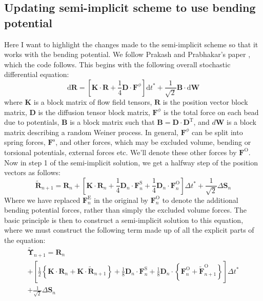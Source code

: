 \documentclass{article}
\begin{document}
\subsection{Updating semi-implicit scheme to use bending potential}
Here I want to highlight the changes made to the semi-implicit scheme so that it works with the bending potential.
We follow Prakash and Prabhakar's paper \cite{Prabhakar2004}, which the code follows.
This begins with the following overall stochastic differential equation:
\begin{equation}
    \mathrm{d} \boldsymbol{R}=\left[\boldsymbol{K} \cdot \boldsymbol{R}+\frac{1}{4} \boldsymbol{D} \cdot \boldsymbol{F}^{\phi}\right] \mathrm{d} t^{*}+\frac{1}{\sqrt{2}} \boldsymbol{B} \cdot \mathrm{d} \boldsymbol{W}
\end{equation}
where $\bm{K}$ is a block matrix of flow field tensors, $\bm{R}$ is the position vector block matrix, $\bm{D}$ is the diffusion tensor block matrix, $\bm{F}^{\phi}$ is the total force on each bead due to potentials, $\bm{B}$ is a block matrix such that $\bm{B} = \bm{D} \cdot \bm{D}^{\mathrm{T}}$, and $d\bm{W}$ is a block matrix describing a random Weiner process.
In general, $\bm{F}^{\phi}$ can be split into spring forces, $\bm{F}^{\mathrm{s}}$, and other forces, which may be excluded volume, bending or torsional potentials, external forces etc.
We'll denote these other forces by $\bm{F}^{\mathrm{O}}$.
Now in step 1 of the semi-implicit solution, we get a halfway step of the position vectors as follows:
\begin{equation}
    \tilde{\boldsymbol{R}}_{n+1}=\boldsymbol{R}_{n}+\left[\boldsymbol{K} \cdot \boldsymbol{R}_{n}+\frac{1}{4} \boldsymbol{D}_{n} \cdot \boldsymbol{F}_{n}^{\mathrm{S}}+\frac{1}{4} \boldsymbol{D}_{n} \cdot \boldsymbol{F}_{n}^{\mathrm{O}}\right] \Delta t^{*}+\frac{1}{\sqrt{2}} \Delta \boldsymbol{S}_{n}
\end{equation}
Where we have replaced $\boldsymbol{F}_{n}^{\mathrm{E}}$ in the original by $\boldsymbol{F}_{n}^{\mathrm{O}}$ to denote the additional bending potential forces, rather than simply the excluded volume forces.
The basic principle is then to construct a semi-implicit solution to this equation, where we must construct the following term made up of all the explicit parts of the equation:
\begin{multline}
    \tilde{\boldsymbol{\Upsilon}}_{n+1}=\boldsymbol{R}_{n} \\
    +\left[\frac{1}{2}\left\{\boldsymbol{K} \cdot \boldsymbol{R}_{n}+\boldsymbol{K} \cdot \tilde{\boldsymbol{R}}_{n+1}\right\}  +\frac{1}{8} \boldsymbol{D}_{n} \cdot \boldsymbol{F}_{n}^{\mathrm{S}}+\frac{1}{8} \boldsymbol{D}_{n} \cdot\left\{\boldsymbol{F}_{n}^{\mathrm{O}}+\tilde{\boldsymbol{F}}_{n+1}^{\mathrm{O}}\right\}\right] \Delta t^{*} \\
     + \frac{1}{\sqrt{2}} \Delta \boldsymbol{S}_{n}
\end{multline}
\end{document}
